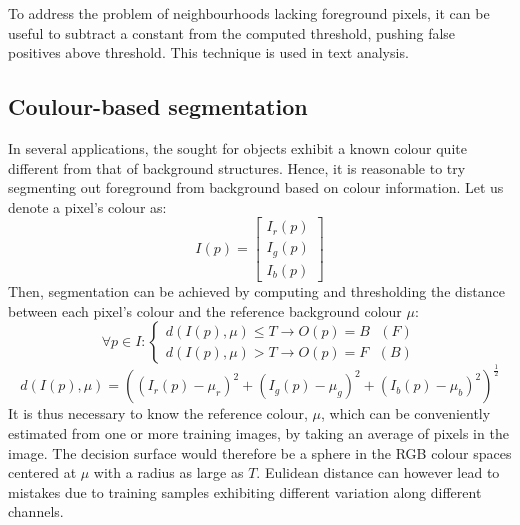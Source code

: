 \documentclass{article}
\begin{document}
To address the problem of neighbourhoods lacking foreground pixels, it can be useful to subtract a constant from the computed threshold, pushing false positives above threshold. This technique is used in text analysis.


\subsection{Coulour-based segmentation}
In several applications, the sought for objects exhibit a known colour quite different from that of background structures. Hence, it is reasonable to try segmenting out foreground from background based on colour information. Let us denote a pixel's colour as:
\[
    I(p)=\begin{bmatrix}
        I_r(p) \\
        I_g(p) \\
        I_b(p) 
    \end{bmatrix}
\]
Then, segmentation can be achieved by computing and thresholding the distance between each pixel's colour and the reference background colour $\mu$:
\[
    \forall p \in I : \begin{cases}
        d(I(p),\mu)\leq T \rightarrow O(p) = B \text{ } (F)\\
        d(I(p),\mu) >T \rightarrow O(p) = F \text{ } (B)
    \end{cases}
\]
\[
    d(I(p),\mu) = ((I_r(p)-\mu_r)^2+(I_g(p)-\mu_g)^2+(I_b(p)-\mu_b)^2)^{\frac{1}{2}}
\]
It is thus necessary to know the reference colour, $\mu$, which can be conveniently estimated from one or more training images, by taking an average of pixels in the image. The decision surface would therefore be a sphere in the RGB colour spaces centered at $\mu$ with a radius as large as $T$. Eulidean distance can however lead to mistakes due to training samples exhibiting different variation along different channels.
\end{document}
